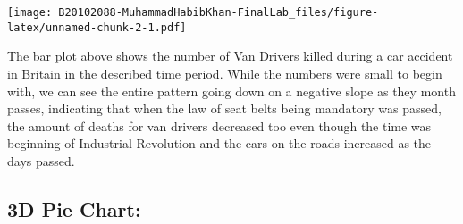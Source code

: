 \documentclass[
]{article}
\newenvironment{Shaded}{\begin{snugshade}}{\end{snugshade}}
\newcommand{\AttributeTok}[1]{\textcolor[rgb]{0.77,0.63,0.00}{#1}}
\newcommand{\CommentTok}[1]{\textcolor[rgb]{0.56,0.35,0.01}{\textit{#1}}}
\newcommand{\DecValTok}[1]{\textcolor[rgb]{0.00,0.00,0.81}{#1}}
\newcommand{\FunctionTok}[1]{\textcolor[rgb]{0.00,0.00,0.00}{#1}}
\newcommand{\NormalTok}[1]{#1}
\newcommand{\OtherTok}[1]{\textcolor[rgb]{0.56,0.35,0.01}{#1}}
\newcommand{\SpecialCharTok}[1]{\textcolor[rgb]{0.00,0.00,0.00}{#1}}
\newcommand{\StringTok}[1]{\textcolor[rgb]{0.31,0.60,0.02}{#1}}
\begin{document}
\texttt{[image: B20102088-MuhammadHabibKhan-FinalLab\_files/figure-latex/unnamed-chunk-2-1.pdf]}

The bar plot above shows the number of Van Drivers killed during a car
accident in Britain in the described time period. While the numbers were
small to begin with, we can see the entire pattern going down on a
negative slope as they month passes, indicating that when the law of
seat belts being mandatory was passed, the amount of deaths for van
drivers decreased too even though the time was beginning of Industrial
Revolution and the cars on the roads increased as the days passed.

\hypertarget{d-pie-chart}{%
\subsection{3D Pie Chart:}\label{d-pie-chart}}

\begin{Shaded}
\end{Shaded}
\end{document}
